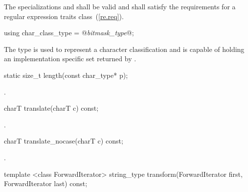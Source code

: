 \pnum
{}%
%
%
The specializations  and
 shall be valid and shall satisfy the
requirements for a regular expression traits class~(\ref{re.req}).

%
\begin{itemdecl}
using char_class_type = @\textit{bitmask_type}@;
\end{itemdecl}

\begin{itemdescr}
\pnum
The type  is used to represent a character
classification and is capable of holding an implementation specific
set returned by .
\end{itemdescr}

%
\begin{itemdecl}
static size_t length(const char_type* p);
\end{itemdecl}

\begin{itemdescr}
\pnum\returns {}.
\end{itemdescr}

%
\begin{itemdecl}
charT translate(charT c) const;
\end{itemdecl}

\begin{itemdescr}
\pnum\returns {}.
\end{itemdescr}

%
\begin{itemdecl}
charT translate_nocase(charT c) const;
\end{itemdecl}

\begin{itemdescr}
\pnum\returns {}.
\end{itemdescr}

%
\begin{itemdecl}
template <class ForwardIterator>
  string_type transform(ForwardIterator first, ForwardIterator last) const;
\end{itemdecl}

